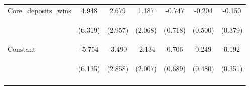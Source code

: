 \documentclass[]{article}
\begin{document}
\begin{center}
\begin{tabular}{lcccccc}
Core\_deposits\_wins & 4.948 & 2.679 & 1.187 & -0.747 & -0.204 & -0.150 \\
\vspace{4pt} & \begin{footnotesize}(6.319)\end{footnotesize} & \begin{footnotesize}(2.957)\end{footnotesize} & \begin{footnotesize}(2.068)\end{footnotesize} & \begin{footnotesize}(0.718)\end{footnotesize} & \begin{footnotesize}(0.500)\end{footnotesize} & \begin{footnotesize}(0.379)\end{footnotesize} \\
Constant & -5.754 & -3.490 & -2.134 & 0.706 & 0.249 & 0.192 \\
 & \begin{footnotesize}(6.135)\end{footnotesize} & \begin{footnotesize}(2.858)\end{footnotesize} & \begin{footnotesize}(2.007)\end{footnotesize} & \begin{footnotesize}(0.689)\end{footnotesize} & \begin{footnotesize}(0.480)\end{footnotesize} & \begin{footnotesize}(0.351)\end{footnotesize} \\
\vspace{4pt} & \begin{footnotesize}\end{footnotesize} & \begin{footnotesize}\end{footnotesize} & \begin{footnotesize}\end{footnotesize} & \begin{footnotesize}\end{footnotesize} & \begin{footnotesize}\end{footnotesize} & \begin{footnotesize}\end{footnotesize} \\

\end{tabular}
\end{center}
\end{document}
